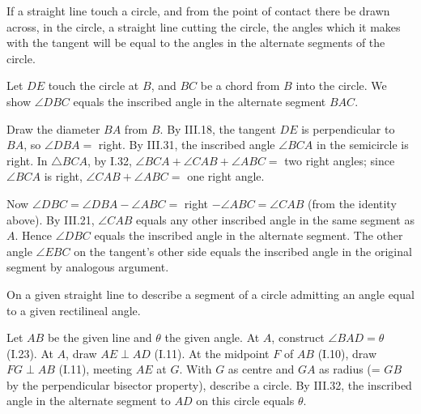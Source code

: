 \documentclass{rrxiv}
\begin{document}
\begin{claim}
\label{prop:III.32}
If a straight line touch a circle, and from the point of contact
there be drawn across, in the circle, a straight line cutting the
circle, the angles which it makes with the tangent will be equal to
the angles in the alternate segments of the circle.
\end{claim}
\begin{evidence}
\label{ev:III.32}
Let $DE$ touch the circle at $B$, and $BC$ be a chord from $B$ into
the circle.  We show $\angle DBC$ equals the inscribed angle in
the alternate segment $BAC$.

Draw the diameter $BA$ from $B$.  By III.18, the tangent $DE$ is
perpendicular to $BA$, so $\angle DBA = $ right.  By III.31, the
inscribed angle $\angle BCA$ in the semicircle is right.  In
$\triangle BCA$, by I.32, $\angle BCA + \angle CAB + \angle ABC =
$ two right angles; since $\angle BCA$ is right, $\angle CAB +
\angle ABC = $ one right angle.

Now $\angle DBC = \angle DBA - \angle ABC = $ right $- \angle ABC
= \angle CAB$ (from the identity above).  By III.21, $\angle CAB$
equals any other inscribed angle in the same segment as $A$.
Hence $\angle DBC$ equals the inscribed angle in the alternate
segment.  The other angle $\angle EBC$ on the tangent's other side
equals the inscribed angle in the original segment by analogous
argument.
\end{evidence}

\begin{claim}
\label{prop:III.33}
On a given straight line to describe a segment of a circle admitting
an angle equal to a given rectilineal angle.
\end{claim}
\begin{evidence}
\label{ev:III.33}
Let $AB$ be the given line and $\theta$ the given angle.  At $A$,
construct $\angle BAD = \theta$ (I.23).  At $A$, draw $AE
\perp AD$ (I.11).  At the midpoint $F$ of $AB$ (I.10), draw
$FG \perp AB$ (I.11), meeting $AE$ at $G$.  With $G$ as centre and
$GA$ as radius (= $GB$ by the perpendicular bisector property),
describe a circle.  By III.32, the inscribed angle in the alternate
segment to $AD$ on this circle equals $\theta$.
\end{evidence}
\end{document}
